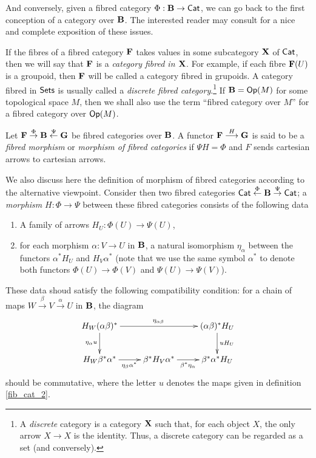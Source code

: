 And conversely, given a fibred category $\Phi :{\bf B}\to \mathsf{Cat}$, we can go back to the first conception of a category over ${\bf B}$. The interested reader may consult \cite{Vistoli:descent} for a nice and complete exposition of these issues.

\begin{obs}
If the fibres of a fibred category ${\bf F}$ takes values in some subcategory ${\bf X}$ of $\mathsf{Cat}$, then we will say that ${\bf F}$ is a \emph{category fibred in ${\bf X}$}. For example, if each fibre ${\bf F}(U)$ is a groupoid, then ${\bf F}$ will be called a category fibred in grupoids. A category fibred in $\mathsf{Sets}$ is usually called a \emph{discrete fibred category}.\footnote{A \emph{discrete} category is a category ${\bf X}$ such that, for each object $X$, the only arrow $X\to X$ is the identity. Thus, a discrete category can be regarded as a set (and conversely).} If ${\bf B}=\mathsf{Op}(M)$ for some topological space $M$, then we shall also use the term ``fibred category over $M$'' for a fibred category over $\mathsf{Op}(M)$. 
\end{obs}

\begin{defi}
Let ${\bf F}\stackrel{\Phi}{\rightarrow}{\bf B}\stackrel{\Psi}{\leftarrow}{\bf G}$ be fibred categories over ${\bf B}$. A functor ${\bf F}\stackrel{H}{\longrightarrow}{\bf G}$ is said to be a \emph{fibred morphism} or \emph{morphism of fibred categories} if $\Psi H=\Phi$ and $F$ sends cartesian arrows to cartesian arrows.
\end{defi}

We also discuss here the definition of morphism of fibred categories according to the alternative viewpoint. Consider then two fibred categories $\mathsf{Cat}\stackrel{\Phi}{\leftarrow}{\bf B}\stackrel{\Psi}{\rightarrow}\mathsf{Cat}$; a \emph{morphism} $H:\Phi \to \Psi$ between these fibred categories consists of the following data
\begin{enumerate}
\item A family of arrows $H_U:\Phi (U)\to \Psi (U)$,
\item for each morphism $\alpha :V\to U$ in ${\bf B}$, a natural isomorphism $\eta_\alpha$ between the functors $\alpha^*H_U$ and $H_V\alpha^*$ (note that we use the same symbol $\alpha^*$ to denote both functors $\Phi (U)\to \Phi (V)$ and $\Psi (U)\to \Psi (V)$). 
\end{enumerate}
These data shoud satisfy the following compatibility condition: for a chain of maps $W\stackrel{\beta}{\to}V\stackrel{\alpha}{\to}U$ in ${\bf B}$, the diagram
$$
\xymatrix{
H_W(\alpha \beta )^* \ar[rr]^{\eta_{\alpha \beta}} \ar[d]_{\eta_{\alpha}u} && (\alpha \beta )^*H_U \ar[d]^{uH_U} \\
H_W\beta^*\alpha^* \ar[r]_{\eta_{\beta}\alpha^*} & \beta^*H_V\alpha^* \ar[r]_{\beta^*\eta_\alpha} & \beta^*\alpha^*H_U }
$$
should be commutative, where the letter $u$ denotes the maps given in definition \ref{fib_cat_2}.

